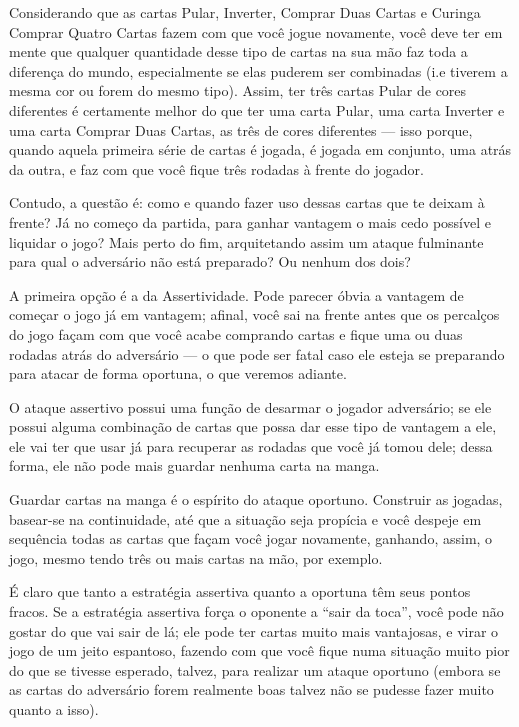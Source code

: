 Considerando que as cartas Pular, Inverter, Comprar Duas Cartas e Curinga Comprar Quatro Cartas fazem com que você jogue novamente, você deve ter em mente que qualquer quantidade desse tipo de cartas na sua mão faz toda a diferença do mundo, especialmente se elas puderem ser combinadas (i.e tiverem a mesma cor ou forem do mesmo tipo). Assim, ter três cartas Pular de cores diferentes é certamente melhor do que ter uma carta Pular, uma carta Inverter e uma carta Comprar Duas Cartas, as três de cores diferentes --- isso porque, quando aquela primeira série de cartas é jogada, é jogada em conjunto, uma atrás da outra, e faz com que você fique três rodadas à frente do jogador.

Contudo, a questão é: como e quando fazer uso dessas cartas que te deixam à frente? Já no começo da partida, para ganhar vantagem o mais cedo possível e liquidar o jogo? Mais perto do fim, arquitetando assim um ataque fulminante para qual o adversário não está preparado? Ou nenhum dos dois?

A primeira opção é a da Assertividade. Pode parecer óbvia a vantagem de começar o jogo já em vantagem; afinal, você sai na frente antes que os percalços do jogo façam com que você acabe comprando cartas e fique uma ou duas rodadas atrás do adversário --- o que pode ser fatal caso ele esteja se preparando para atacar de forma oportuna, o que veremos adiante.

O ataque assertivo possui uma função de desarmar o jogador adversário; se ele possui alguma combinação de cartas que possa dar esse tipo de vantagem a ele, ele vai ter que usar já para recuperar as rodadas que você já tomou dele; dessa forma, ele não pode mais guardar nenhuma carta na manga.

Guardar cartas na manga é o espírito do ataque oportuno. Construir as jogadas, basear-se na continuidade, até que a situação seja propícia e você despeje em sequência todas as cartas que façam você jogar novamente, ganhando, assim, o jogo, mesmo tendo três ou mais cartas na mão, por exemplo.

É claro que tanto a estratégia assertiva quanto a oportuna têm seus pontos fracos. Se a estratégia assertiva força o oponente a ``sair da toca'', você pode não gostar do que vai sair de lá; ele pode ter cartas muito mais vantajosas, e virar o jogo de um jeito espantoso, fazendo com que você fique numa situação muito pior do que se tivesse esperado, talvez, para realizar um ataque oportuno (embora se as cartas do adversário forem realmente boas talvez não se pudesse fazer muito quanto a isso).

